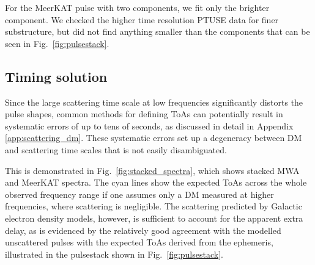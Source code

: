 \documentclass[fleqn,usenatbib]{mnras}
\newcommand{\revision}[2]{{\color{red}#2}}
\newcommand{\Fig}{Fig.}
\begin{document}
For the MeerKAT pulse with two components, we fit only the brighter component.
\revision{}{We checked the higher time resolution PTUSE data for finer substructure, but did not find anything smaller than the components that can be seen in \Fig~\ref{fig:pulsestack}.}

\subsection{Timing solution} \label{sec:timing}

Since the large scattering time scale at low frequencies significantly distorts the pulse shapes, common methods for defining ToAs can potentially result in systematic errors of up to tens of seconds, as discussed in detail in Appendix \ref{app:scattering_dm}.
These systematic errors set up a degeneracy between DM and scattering time scales that is not easily disambiguated.

This is demonstrated in \Fig~\ref{fig:stacked_spectra}, which shows stacked MWA and MeerKAT spectra.
The cyan lines show the expected ToAs across the whole observed frequency range if one assumes only a DM measured at higher frequencies, where scattering is negligible.
The scattering predicted by Galactic electron density models, however, is sufficient to account for the apparent extra delay, as is evidenced by the relatively good agreement with the modelled unscattered pulses with the expected ToAs derived from the ephemeris, illustrated in the pulsestack shown in \Fig~\ref{fig:pulsestack}.
\end{document}
